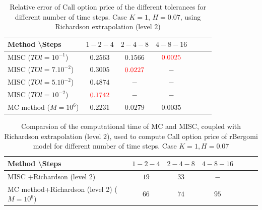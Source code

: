 \documentclass[11pt]{article}
\begin{document}
\begin{table}[h!]
	\centering
	\begin{tabular}{l*{5}{c}r}
		Method \textbackslash  Steps &$1-2-4$             & $2-4-8$ & $4-8-16$   \\
		\hline
		MISC ($TOl=10^{-1}$)  &$0.2563$ &  $0.1566$ & ${\color{red}  0.0025}$  \\
		MISC ($TOl=7.10^{-2}$) &$  0.3005$ &  $  {\color{red}0.0227}$ & $-$    \\
		MISC ($TOl=5.10^{-2}$) &$0.4874$ &  $  -$ & $-$    \\
		MISC ($TOl=10^{-2}$)&$ {\color{red}0.1742}$ &  $-$ & $-$  \\	
		MC method ($M=10^{6}$)  &$\mathbf{0.2231}$  & $  \mathbf{0.0279}$  & $\mathbf{0.0035}$ \\
		\hline	
		
	\end{tabular}
	\caption{Relative error of Call option price of the different tolerances for different number of time steps. Case $K=1$, $H=0.07$, using Richardson extrapolation (level $2$)}
	\label{Relative error of Call option price of the different tolerances for different number of time steps. Case $K=1, H=0.07$ , using Richardson extrapolation_level2}
\end{table}



\begin{table}[h!]
	\centering
	\begin{tabular}{l*{5}{c}r}
		Method \textbackslash  Steps &$1-2-4$             & $2-4-8$ & $4-8-16$   \\
		\hline
		MISC +Richardson (level 2) &$19$ & $ 33$ & $-$   \\
	
		MC method+Richardson (level 2) ($M=10^{6}$)  &$66$  & $74 $  & $95$ \\
		\hline	
		
	\end{tabular}
	\caption{Comparsion of the computational time of  MC and MISC, coupled with Richardson extrapolation (level $2$), used to compute Call option price of rBergomi model for different number of time steps. Case $K=1, H=0.07$}
	\label{Comparsion of the computational time of  MC and MISC, coupled with Richardson extrapolation (level $2$), used to compute Call option price of rBergomi model for different number of time steps. Case $K=1, H=0.07$}
\end{table}
\end{document}
